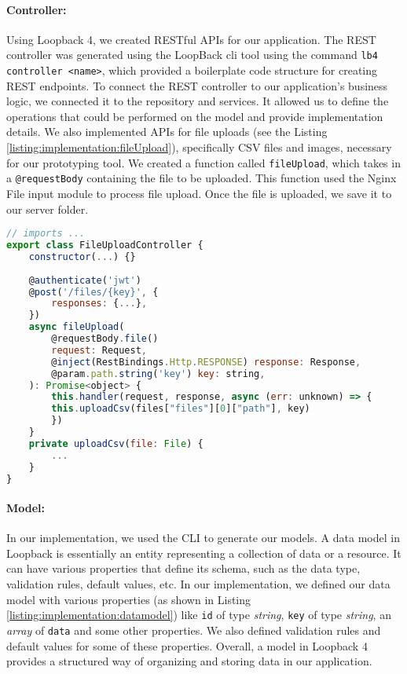 \paragraph{Controller:}
Using Loopback 4, we created RESTful APIs for our application. 
The REST controller was generated using the LoopBack \ac{cli} tool using the command \texttt{lb4 controller <name>}, which provided a boilerplate code structure for creating REST endpoints.
To connect the REST controller to our application's business logic, we connected it to the repository and services. 
It allowed us to define the operations that could be performed on the model and provide implementation details.
We also implemented APIs for file uploads (see the Listing \ref{listing:implementation:fileUpload}), specifically CSV files and images, necessary for our prototyping tool. 
We created a function called \texttt{fileUpload}, which takes in a \texttt{@requestBody} containing the file to be uploaded. 
This function used the Nginx File input module to process file upload. 
Once the file is uploaded, we save it to our server folder.

\begin{lstlisting}[language=JavaScript, caption=The Typescript File for the Rest Controller for File Upload, label=listing:implementation:fileUpload]
// imports ...
export class FileUploadController {
    constructor(...) {}
    
    @authenticate('jwt')
    @post('/files/{key}', {
        responses: {...},
    })
    async fileUpload(
        @requestBody.file()
        request: Request,
        @inject(RestBindings.Http.RESPONSE) response: Response,
        @param.path.string('key') key: string,
    ): Promise<object> {
        this.handler(request, response, async (err: unknown) => {
        this.uploadCsv(files["files"][0]["path"], key)
        })
    }
    private uploadCsv(file: File) {
        ...
    }
}
\end{lstlisting}

\paragraph{Model:}
In our implementation, we used the CLI to generate our models.
A data model in Loopback is essentially an entity representing a collection of data or a resource. It can have various properties that define its schema, such as the data type, validation rules, default values, etc.
In our implementation, we defined our data model with various properties (as shown in Listing \ref{listing:implementation:datamodel}) like \texttt{id} of type \textit{string}, \texttt{key} of type \textit{string}, an \textit{array} of \texttt{data} and some other properties.
We also defined validation rules and default values for some of these properties.
Overall, a model in Loopback 4 provides a structured way of organizing and storing data in our application.

